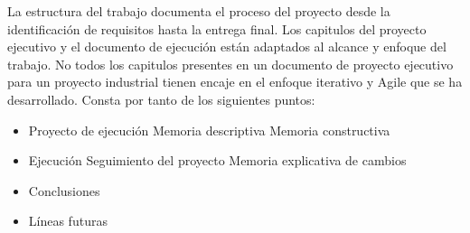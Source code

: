 
La estructura del trabajo documenta el proceso del proyecto desde la identificación de requisitos hasta la entrega final. Los capitulos del proyecto ejecutivo y el documento de ejecución están adaptados al alcance y enfoque del trabajo. No todos los capitulos presentes en un documento de proyecto ejecutivo para un proyecto industrial tienen encaje en el enfoque iterativo y Agile que se ha desarrollado. Consta por tanto de los siguientes puntos:

\begin{itemize}
    \item Proyecto de ejecución
        \subitem Memoria descriptiva
        \subitem Memoria constructiva
    \item Ejecución
        \subitem Seguimiento del proyecto
        \subitem Memoria explicativa de cambios
    \item Conclusiones
    \item Líneas futuras
\end{itemize}

